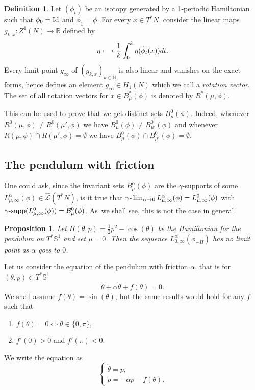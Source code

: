 \documentclass[JEP,XML,SOM,Unicode,NoFloatCountersInSection,published]{cedram}
\newcommand\mto{\mathchoice{\longmapsto}{\mapsto}{\mapsto}{\mapsto}}
\newtheorem{prop}[thm]{Proposition}
\theoremstyle{definition}
\newtheorem{defn}[thm]{Definition}
\newcommand{\B}{{\mathcal B}}
\newcommand{\N}{\mathbb{N}}
\newcommand{\R}{\mathbb{R}}
\newcommand{\bS}{\mathbb{S}}
\DeclareMathOperator{\gammasupp}{\gamma\textup{-supp}}
\begin{document}
\begin{defn} Let $(\phi_t)$ be an isotopy generated by a 1-periodic Hamiltonian such that $\phi_0={\rm Id}$ and $\phi_1=\phi$. For every $x\in T^*N$, consider the linear maps $g_{k, x}:Z^1(N)\to \R$ defined by
\[
\eta\mto\frac{1}{k}\int_0^k\eta(\dot \phi_t(x))dt.
\]
Every limit point $g_\infty$ of $(g_{k, x})_{k\in\N}$ is also linear and vanishes on the exact forms, hence defines an element $g_\infty\in H_1(N)$ which we call a \emph{rotation vector}. The set of all rotation vectors for $x \in B_{\mu}^*(\phi)$ is denoted by $R^*(\mu,\phi)$.
\end{defn}
This can be used to prove that we get distinct sets $B_{\mu}^0(\phi)$. Indeed, whenever $R^0(\mu,\phi)\neq R^0(\mu',\phi)$ we have $B_{\mu}^0(\phi)\neq B_{\mu'}^0(\phi)$ and whenever
$R(\mu,\phi)\cap R(\mu',\phi)=\emptyset$ we have $B_{\mu}^0(\phi)\cap B_{\mu'}^0(\phi)=\emptyset$.

\subsection{The pendulum with friction}
One could ask, since the invariant sets $B^\alpha_{\mu}(\phi)$ are the $\gamma$\nobreakdash-supports of some $L^\alpha_{\mu,\infty}(\phi) \in \widehat{\mathcal L} (T^*N)$, is it true that $\gamma\textup{-}\lim_{\alpha\to 0} L^\alpha_{\mu,\infty}(\phi)=L^0_{\mu,\infty}(\phi)$ with $\gammasupp (L^0_{\mu,\infty}(\phi))=\B^0_{\mu}(\phi)$. As~we shall see, this is not the case in general.

\begin{prop}
Let $H(\theta,p)= \frac{1}{2}p^2-\cos(\theta)$ be the Hamiltonian for the pendulum on $T^*\bS^1$ and set $\mu=0$. Then the sequence $L^\alpha_{0,\infty}(\phi_{-H})$ has no limit point as $ \alpha$ goes to $0$.
\end{prop}

Let us consider the equation of the pendulum with friction $\alpha$, that is for $(\theta, p)\in T^*\bS^1$
\begin{equation}\label{eq:pendulum} \ddot \theta + \alpha \dot \theta + f(\theta)=0.
\end{equation}
We shall assume $f(\theta)=\sin(\theta)$, but the same results would hold for any $f$ such that
\begin{enumerate}
\item $f(\theta)=0 \Leftrightarrow \theta \in \{0,\pi\}$,
\item $f'(0)>0$ and $f'(\pi)<0$.
\end{enumerate}
We write the equation as
\begin{equation}\label{eq:pendulum2}
\begin{cases}
\dot \theta =p,\\
\dot p=- \alpha p - f(\theta).
\end{cases}
\end{equation}
\end{document}

